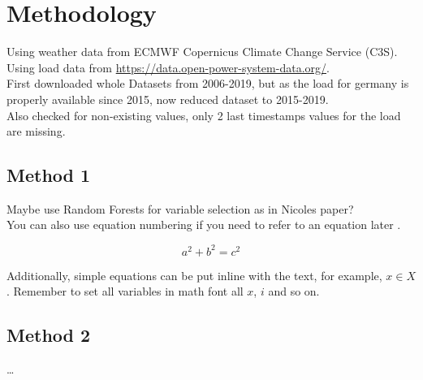 \chapter{Methodology}
\label{ch:methods}


Using weather data from ECMWF Copernicus Climate Change Service (C3S).\\
Using load data from \url{https://data.open-power-system-data.org/}.\\
First downloaded whole Datasets from 2006-2019, but as the load for germany is properly available since 2015, now reduced dataset to 2015-2019.\\
Also checked for non-existing values, only 2 last timestamps values for the load are missing.\\

\section{Method 1}

Maybe use Random Forests for variable selection as in Nicoles paper? \cite{Ludwig2015}\\


You can also use equation numbering if you need to refer to an equation later \eg {}.


\begin{equation}
a^2 + b^2 = c^2
\label{eq:ex1}
\end{equation}

Additionally, simple equations can be put inline with the text, for example, $x \in X$. Remember to set all variables in math font \ie all $x$, $i$ and so on.

\section{Method 2}

\dots

